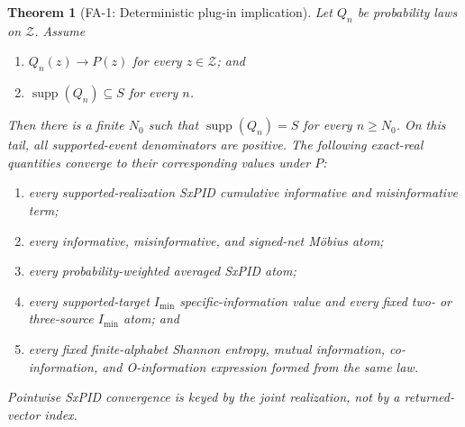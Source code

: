 \documentclass[11pt]{article}
\newtheorem{theorem}{Theorem}[section]
\theoremstyle{definition}
\newcommand{\cZ}{\mathcal{Z}}
\newcommand{\supp}{\operatorname{supp}}
\newcommand{\imin}{I_{\min}}
\begin{document}
\begin{theorem}[FA-1: Deterministic plug-in implication]\label{thm:deterministic}
Let $Q_n$ be probability laws on $\cZ$.  Assume
\begin{enumerate}[label=(\roman*)]
  \item $Q_n(z)\to P(z)$ for every $z\in\cZ$; and
  \item $\supp(Q_n)\subseteq S$ for every $n$.
\end{enumerate}
Then there is a finite $N_0$ such that $\supp(Q_n)=S$ for every $n\ge N_0$.  On this tail, all
supported-event denominators are positive.  The following exact-real quantities converge to their
corresponding values under $P$:
\begin{enumerate}
  \item every supported-realization SxPID cumulative informative and misinformative term;
  \item every informative, misinformative, and signed-net M{\"o}bius atom;
  \item every probability-weighted averaged SxPID atom;
  \item every supported-target $\imin$ specific-information value and every fixed two- or
    three-source $\imin$ atom; and
  \item every fixed finite-alphabet Shannon entropy, mutual information, co-information, and
    O-information expression formed from the same law.
\end{enumerate}
Pointwise SxPID convergence is keyed by the joint realization, not by a returned-vector index.
\end{theorem}
\end{document}
